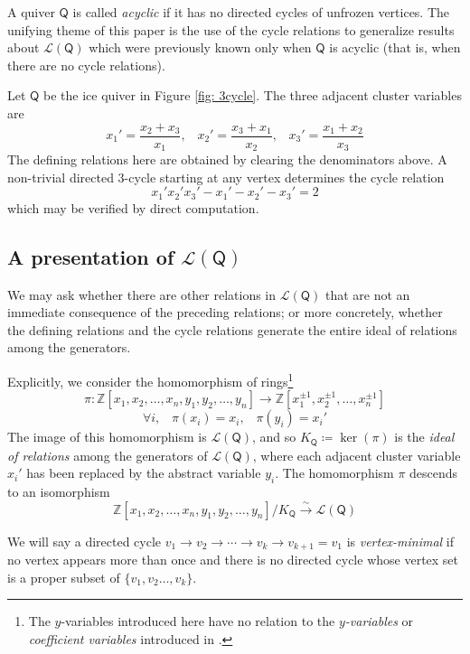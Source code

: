 \documentclass[ALCO,published]{cedram}
\numberwithin{equation}{section}
\renewcommand{\L}{\mathcal{L}}%
\newcommand{\1}{^{-1}}
\def\ZZ{\mathbb{Z}}
\newcommand{\garrow}[1]{\stackrel{#1}{\longrightarrow}}
\def\Q{\mathsf{Q}}
\begin{document}
\begin{rem}
A quiver $\Q$ is called \textit{acyclic} if it has no directed cycles of unfrozen vertices.  The unifying theme of this paper is the use of the cycle relations to generalize results about $\L(\Q)$ which were previously known only when $\Q$ is acyclic (that is, when there are no cycle relations).
\end{rem}

\begin{ex}
Let $\Q$ be the ice quiver in Figure \ref{fig: 3cycle}.  The three adjacent cluster variables are 
\[ x_1'= \frac{x_2+x_3}{x_1},\;\;\; x_2'=\frac{x_3+x_1}{x_2},\;\;\; x_3'=\frac{x_1+x_2}{x_3} \]
The defining relations here are obtained by clearing the denominators above.  A non-trivial directed $3$-cycle starting at any vertex determines the cycle relation
\[ x_1'x_2'x_3' - x_1'-x_2'-x_3'=2\]
which may be verified by direct computation.
\end{ex}

\subsection{A presentation of $\L(\Q)$}

We may ask whether there are other relations in $\L(\Q)$ that are not an immediate consequence of the preceding relations; or more concretely, whether the defining relations and the cycle relations generate the entire ideal of relations among the generators.

Explicitly, we consider the homomorphism of rings\footnote{The $y$-variables introduced here have no relation to the \emph{$y$-variables} or \emph{coefficient variables} introduced in \cite{FZ07}.}
\[ \pi :\ZZ[x_1,x_2,\dots,x_n,y_1,y_2,\dots,y_n]\longrightarrow \ZZ[x_1^{\pm1},x_2^{\pm1},\dots,x_n^{\pm1} ]\]
\[ \forall i, \;\;\; \pi(x_i) = x_i,\;\;\; \pi(y_i)=x_i'\]
The image of this homomorphism is $\L(\Q)$, and so $K_\Q \coloneqq \ker(\pi)$ is the \textit{ideal of relations} among the generators of $\L(\Q)$, where each adjacent cluster variable $x_i'$ has been replaced by the abstract variable $y_i$.  The homomorphism $\pi$ descends to an isomorphism
\[ \ZZ[x_1,x_2,\dots,x_n,y_1,y_2,\dots,y_n]/K_\Q\garrow{\sim} \L(\Q) \]

We will say a directed cycle $v_1\rightarrow v_2 \rightarrow \cdots \rightarrow v_k\rightarrow v_{k+1}=v_1$ is \textit{vertex-minimal} if no vertex appears more than once and there is no directed cycle whose vertex set is a proper subset of $\{v_1,v_2\dots,v_k\}$.
\end{document}
